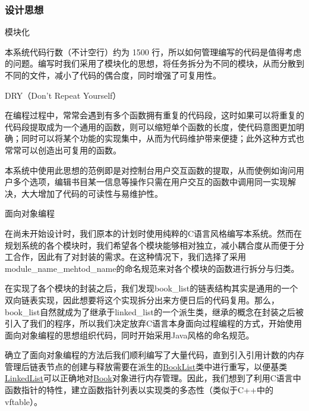 \subsubsection*{设计思想}


\begin{DoxyEnumerate}
\item 模块化

本系统代码行数（不计空行）约为 1500 行，所以如何管理编写的代码是值得考虑的问题。编写时我们采用了模块化的思想，将任务拆分为不同的模块，从而分散到不同的文件，减小了代码的偶合度，同时增强了可复用性。
\item D\-R\-Y（\-Don't Repeat Yourself）

在编程过程中，常常会遇到有多个函数拥有重复的代码段，这时如果可以将重复的代码段提取成为一个通用的函数，则可以缩短单个函数的长度，使代码意图更加明确；同时可以将某个功能的实现集中，从而为代码维护带来便捷；此外这种方式也常常可以创造出可复用的函数。

本系统中使用此思想的范例即是对控制台用户交互函数的提取，从而使例如询问用户多个选项，编辑书目某一信息等操作只需在用户交互的函数中调用同一实现解决，大大增加了代码的可读性与易维护性。
\item 面向对象编程

在尚未开始设计时，我们原本的计划时使用纯粹的{\ttfamily C}语言风格编写本系统。然而在规划系统的各个模块时，我们希望各个模块能够相对独立，减小耦合度从而便于分工合作，因此有了对{\ttfamily 封装}的需求。在这种情况下，我们选择了采用{\ttfamily module\-\_\-name\-\_\-mehtod\-\_\-name}的命名规范来对各个模块的函数进行拆分与归类。

在实现了各个模块的{\ttfamily 封装}之后，我们发现{\ttfamily book\-\_\-list}的链表结构其实是通用的一个双向链表实现，因此想要将这个实现拆分出来方便日后的代码复用。那么，{\ttfamily book\-\_\-list}自然就成为了{\ttfamily 继承}于{\ttfamily linked\-\_\-list}的一个派生类，{\ttfamily 继承}的概念在{\ttfamily 封装}之后被引入了我们的程序，所以我们决定放弃{\ttfamily C}语言本身{\ttfamily 面向过程编程}的方式，开始使用{\ttfamily 面向对象编程}的思想组织代码，同时开始采用{\ttfamily Java}风格的命名规范。

确立了面向对象编程的方法后我们顺利编写了大量代码，直到引入{\ttfamily 引用计数}的内存管理后链表节点的创建与释放需要在派生的{\ttfamily \hyperlink{structBookList}{Book\-List}}类中进行{\ttfamily 重写}，以便基类{\ttfamily \hyperlink{structLinkedList}{Linked\-List}}可以正确地对{\ttfamily \hyperlink{structBook}{Book}}对象进行内存管理。因此，我们想到了利用{\ttfamily C}语言中函数指针的特性，建立函数指针列表以实现类的{\ttfamily 多态}性（类似于{\ttfamily C++}中的{\ttfamily vftable}）。


\end{DoxyEnumerate}
